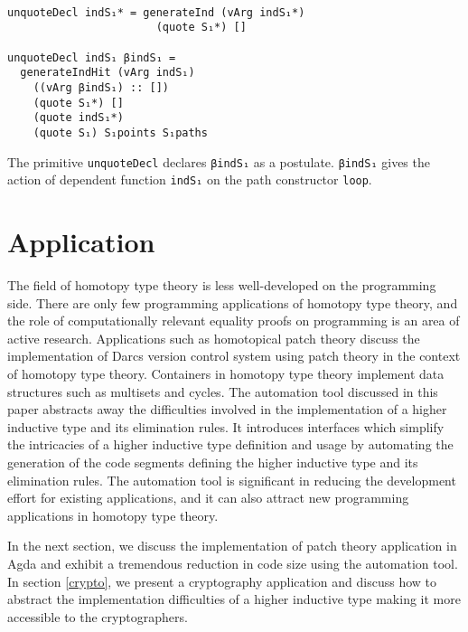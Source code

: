 \documentclass[sigplan,10pt]{acmart}
\begin{document}
\begin{center}
\begingroup
\begin{BVerbatim}

unquoteDecl indS₁* = generateInd (vArg indS₁*)
                       (quote S₁*) []

unquoteDecl indS₁ βindS₁ = 
  generateIndHit (vArg indS₁)
    ((vArg βindS₁) :: [])
    (quote S₁*) []
    (quote indS₁*)
    (quote S₁) S₁points S₁paths

\end{BVerbatim}
\endgroup
\end{center}

The primitive {\tt unquoteDecl} declares {\tt βindS₁} as a postulate. {\tt βindS₁} gives the action of dependent function {\tt indS₁} on the path constructor {\tt loop}.

\section{Application}

The field of homotopy type theory is less well-developed on the programming side. There are only few programming applications of homotopy type theory, and the role of computationally relevant equality proofs on programming is an area of active research. Applications such as homotopical patch theory \cite{Angiuli-2014} discuss the implementation of Darcs \cite{Darcs-2005} version control system using patch theory \cite{Mimram-2013} \cite{Jason-2009} in the context of homotopy type theory. Containers in homotopy type theory \cite{Altenkirch-2014} \cite{Abbott-2005} implement data structures such as multisets and cycles. The automation tool discussed in this paper abstracts away the difficulties involved in the implementation of a higher inductive type and its elimination rules. It introduces interfaces which simplify the intricacies of a higher inductive type definition and usage by automating the generation of the code segments defining the higher inductive type and its elimination rules. The automation tool is significant in reducing the development effort for existing applications, and it can also attract new programming applications in homotopy type theory.

In the next section, we discuss the implementation of patch theory application in Agda and exhibit a tremendous reduction in code size using the automation tool. In section \ref{crypto}, we present a cryptography application and discuss how to abstract the implementation difficulties of a higher inductive type making it more accessible to the cryptographers.
\end{document}

